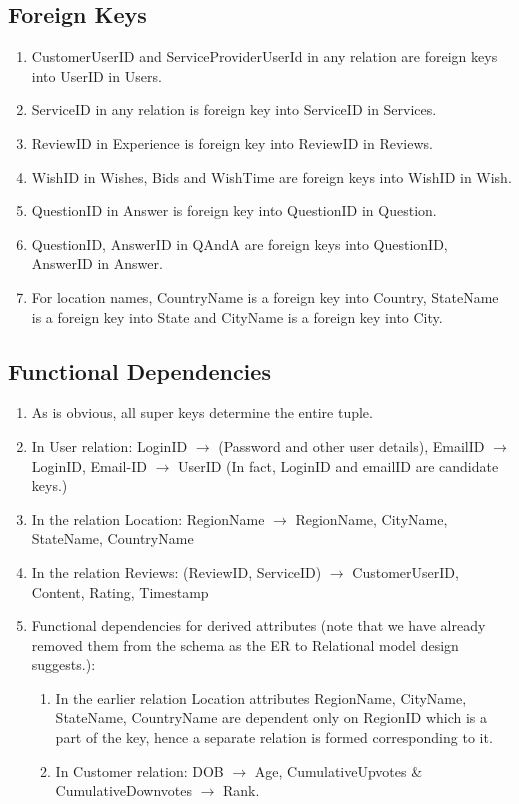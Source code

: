 \documentclass[a4paper]{article}
\begin{document}
\subsection{Foreign Keys}
\begin{enumerate}
\item CustomerUserID and ServiceProviderUserId in any relation are foreign keys into UserID in Users.
\item ServiceID in any relation is foreign key into ServiceID in Services.
\item ReviewID in Experience is foreign key into ReviewID in Reviews.
\item WishID in Wishes, Bids and WishTime are foreign keys into WishID in Wish.
\item QuestionID in Answer is foreign key into QuestionID in Question.
\item QuestionID, AnswerID in QAndA are foreign keys into QuestionID, AnswerID in Answer.
\item For location names, CountryName is a foreign key into Country, StateName is a foreign key into State and CityName is a foreign key into City.
\end{enumerate}



\subsection{Functional Dependencies}
\begin{enumerate}
\item As is obvious, all super keys determine the entire tuple.
\item In User relation: LoginID $\to$ (Password and other user details), EmailID $\to$ LoginID, Email-ID $\to$ UserID (In fact, LoginID and emailID are candidate keys.)
\item In the relation Location:  RegionName $\to$ RegionName, CityName, StateName, CountryName 
\item In the relation Reviews: (ReviewID, ServiceID) $\to$  CustomerUserID, Content, Rating, Timestamp
\item Functional dependencies for derived attributes (note that we have already removed them from the schema as the ER to Relational model design suggests.):
\begin{enumerate}
\item In the earlier relation Location attributes RegionName, CityName, StateName, CountryName are dependent only on RegionID which is a part of the key, hence a separate relation is formed corresponding to it.
\item In Customer relation: DOB $\to$ Age,  CumulativeUpvotes \& CumulativeDownvotes $\to$ Rank.
\end{enumerate}
\end{enumerate}
\end{document}
